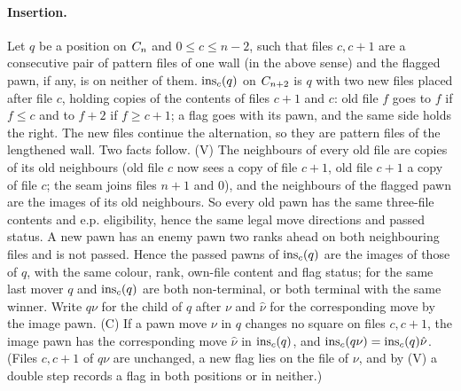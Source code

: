 \begin{wallproof}
\paragraph{Insertion.}
Let $q$ be a position on $C_{n}$ and $0\le c\le n-2$, such that files $c,c+1$ are a consecutive pair of pattern files of one wall (in the above sense) and the flagged pawn, if
any, is on neither of them. $\operatorname{ins}_c(q)$ on $C_{n+2}$ is $q$ with two new files placed after file $c$, holding copies of the contents
of files $c+1$ and $c$: old file $f$ goes to $f$ if $f\le c$ and to $f+2$ if $f\ge c+1$; a flag goes with its pawn, and the same side
holds the right. The new files continue the alternation, so they are pattern files of the lengthened wall. Two facts follow.
(V) The neighbours of every old file are copies of its old neighbours (old file $c$ now sees a copy of file $c+1$, old file $c+1$ a copy
of file $c$; the seam joins files $n+1$ and $0$), and the neighbours of the flagged pawn are the images of its old neighbours. So every old pawn has the same three-file contents and
e.p. eligibility, hence the same legal move directions and passed status. A new pawn has an enemy pawn two ranks ahead on both neighbouring files and is
not passed. Hence the passed pawns of $\operatorname{ins}_c(q)$ are the images of those of $q$, with the same colour, rank, own-file content and
flag status; for the same last mover $q$ and $\operatorname{ins}_c(q)$ are both non-terminal, or both terminal with the same winner.
Write $q\nu$ for the child of $q$ after $\nu$ and $\hat\nu$ for the corresponding move by the image pawn.
(C) If a pawn move $\nu$ in $q$ changes no square on files $c,c+1$, the image pawn has the corresponding move $\hat\nu$ in $\operatorname{ins}_c(q)$, and
$\operatorname{ins}_c(q\nu)=\operatorname{ins}_c(q)\hat\nu$. (Files $c,c+1$ of $q\nu$ are unchanged, a new flag lies on the file of $\nu$, and by (V) a double step
records a flag in both positions or in neither.)


\end{wallproof}
